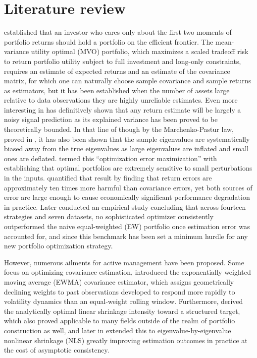 \documentclass[12pt]{article}
\begin{document}
\section{Literature review}
\label{sec:lit-review}
\citet{markowitz1952} established that an investor who cares only about the first two moments of portfolio returns should hold a portfolio on the efficient frontier. The mean-variance utility optimal (MVO) portfolio, which maximizes a scaled tradeoff risk to return portfolio utility subject to full investment and long-only constraints, requires an estimate of expected returns and an estimate of the covariance matrix, for which one can naturally choose sample covariance and sample returns as estimators, but it has been established when the number of assets large relative to data observations they are highly unreliable estimates. Even more interesting in \cite{campbellthompson2008} has definitively shown that any return estimate will be largely a noisy signal prediction as its explained variance has been proved to be theoretically bounded. In that line of though by the Marchenko-Pastur law, proved in \citet{marchenkopastur1967}, it has also been shown that the sample eigenvalues are systematically biased away from the true eigenvalues as large eigenvalues are inflated and small ones are deflated. \citet{michaud1989} termed this ``optimization error maximization'' with \citet{bestgrauer1991} establishing that optimal portfolios are extremely sensitive to small perturbations in the inputs. \citet{chopraziemba1993} quantified that result by finding that return errors are approximately ten times more harmful than covariance errors, yet both sources of error are large enough to cause economically significant performance degradation in practice. Later \citet{demiguel2009} conducted an empirical study concluding that across fourteen strategies and seven datasets, no sophisticated optimizer consistently outperformed the naive equal-weighted (EW) portfolio once estimation error was accounted for, and since this benchmark has been set a minimum hurdle for any new portfolio optimization strategy. 

However, numerous ailments for active management have been proposed. Some focus on optimizing covariance estimation, \citet{riskmetrics1996} introduced the exponentially weighted moving average (EWMA) covariance estimator, which assigns geometrically declining weights to past observations developed to respond more rapidly to volatility dynamics than an equal-weight rolling window. Furthermore, \citet{ledoitwolf2004} derived the analytically optimal linear shrinkage intensity toward a structured target, which also proved applicable to many fields outside of the realm of portfolio construction as well, and later in \citet{ledoitwolf2020} extended this to eigenvalue-by-eigenvalue nonlinear shrinkage (NLS) greatly improving estimation outcomes in practice at the cost of asymptotic consistency. 
\end{document}
